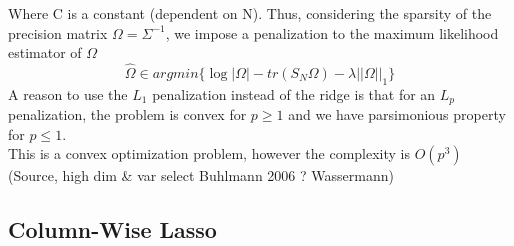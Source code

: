 \documentclass[12pt]{article}
\def\hat{\widehat}
\begin{document}
Where C is a constant (dependent on N). Thus, considering the sparsity of the precision matrix $\Omega=\Sigma^{-1}$, we impose a penalization to the maximum likelihood estimator of $\Omega$
\begin{equation}
\hat\Omega\in argmin\big\{ \log|\Omega|-tr(S_N\Omega)-\lambda||\Omega||_1   \big\}
\end{equation}
A reason to use the $L_1$ penalization instead of the ridge is that for an $L_p$ penalization, the problem is convex for $p\geq 1$ and we have parsimonious property for $p\leq 1$.\\
This is a convex optimization problem, however the complexity is $O(p^3)$ (Source, high dim \& var select Buhlmann 2006 ? Wassermann)
\subsection{Column-Wise Lasso}
\end{document}
